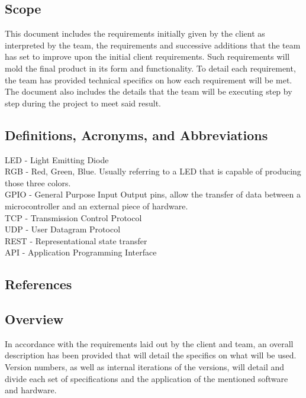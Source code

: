 \documentclass[onecolumn, draftclsnofoot,10pt, compsoc]{IEEEtran}
\begin{document}
		\subsection{Scope}
			This document includes the requirements initially given by the client as interpreted by the team, the requirements and successive additions that the team has set to improve upon the initial client requirements. Such requirements will mold the final product in its form and functionality.
			To detail each requirement, the team has provided technical specifics on how each requirement will be met.  The document also includes the details that the team will be executing step by step
			during the project to meet said result.

		\subsection{Definitions, Acronyms, and Abbreviations}
			LED - Light Emitting Diode \\
			RGB - Red, Green, Blue. Usually referring to a LED that is capable of producing those three colors. \\
			GPIO - General Purpose Input Output pins, allow the transfer of data between a microcontroller and an external piece of hardware. \\
			TCP - Transmission Control Protocol \\
			UDP - User Datagram Protocol \\
			REST - Representational state transfer \\
			API - Application Programming Interface \\

		\subsection{References}
		
		

		\subsection{Overview}
			In accordance with the requirements laid out by the client and team, an overall description has been provided that will detail the specifics on what will be used. Version numbers, as well as internal iterations of the versions, will detail
			and divide each set of specifications and the application of the mentioned software and hardware.
\end{document}

